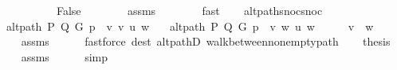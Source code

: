 \begin{isabellebody}
\ \ \ \ \isamarkupfalse%
\isanewline
\ \ \ \ \isamarkupfalse%
\ \isamarkupfalse%
\ False\isanewline
\ \ \ \ \ \ \isamarkupfalse%
\ assms{\isacharparenleft}{\kern0pt}{}{\isacharparenright}{\kern0pt}\isanewline
\ \ \ \ \ \ \isamarkupfalse%
\ fast\isanewline
\ \ \isamarkupfalse%
\isanewline
{}\isamarkupfalse%
%
\endisatagproof
{\isafoldproof}%
%
\isadelimproof
\isanewline
%
\endisadelimproof
%
\isadeliminvisible
\isanewline
%
\endisadeliminvisible
%
\isataginvisible
{}\isamarkupfalse%
\ alt{\isacharunderscore}{\kern0pt}path{\isacharunderscore}{\kern0pt}snoc{\isacharunderscore}{\kern0pt}snoc{\isacharcolon}{\kern0pt}\isanewline
\ \ \ {\isachardoublequoteopen}alt{\isacharunderscore}{\kern0pt}path\ P\ Q\ G\ {\isacharparenleft}{\kern0pt}p\ {\isacharat}{\kern0pt}\ {\isacharbrackleft}{\kern0pt}v{\isacharcomma}{\kern0pt}\ v{\isacharprime}{\kern0pt}{\isacharbrackright}{\kern0pt}{\isacharparenright}{\kern0pt}\ u\ w{\isachardoublequoteclose}\isanewline
\ \ \ {\isachardoublequoteopen}alt{\isacharunderscore}{\kern0pt}path\ P\ Q\ G\ {\isacharparenleft}{\kern0pt}p\ {\isacharat}{\kern0pt}\ {\isacharbrackleft}{\kern0pt}v{\isacharcomma}{\kern0pt}\ w{\isacharbrackright}{\kern0pt}{\isacharparenright}{\kern0pt}\ u\ w{\isachardoublequoteclose}%
\endisataginvisible
{\isafoldinvisible}%
%
\isadeliminvisible
\isanewline
%
\endisadeliminvisible
%
\isadelimproof
%
\endisadelimproof
%
\isatagproof
{}\isamarkupfalse%
\ {\isacharminus}{\kern0pt}\isanewline
\ \ \isamarkupfalse%
\ {\isachardoublequoteopen}v{\isacharprime}{\kern0pt}\ {\isacharequal}{\kern0pt}\ w{\isachardoublequoteclose}\isanewline
\ \ \ \ \isamarkupfalse%
\ assms\isanewline
\ \ \ \ \isamarkupfalse%
\ {\isacharparenleft}{\kern0pt}fastforce\ dest{\isacharcolon}{\kern0pt}\ alt{\isacharunderscore}{\kern0pt}pathD{\isacharparenleft}{\kern0pt}{}{\isacharparenright}{\kern0pt}\ walk{\isacharunderscore}{\kern0pt}between{\isacharunderscore}{\kern0pt}nonempty{\isacharunderscore}{\kern0pt}path{\isacharparenleft}{\kern0pt}{}{\isacharparenright}{\kern0pt}{\isacharparenright}{\kern0pt}\isanewline
\ \ \isamarkupfalse%
\ {\isacharquery}{\kern0pt}thesis\isanewline
\ \ \ \ \isamarkupfalse%
\ assms\isanewline
\ \ \ \ \isamarkupfalse%
\ simp\isanewline
{}\isamarkupfalse%
%
\endisatagproof
{\isafoldproof}%
%
\isadelimproof

\end{isabellebody}
